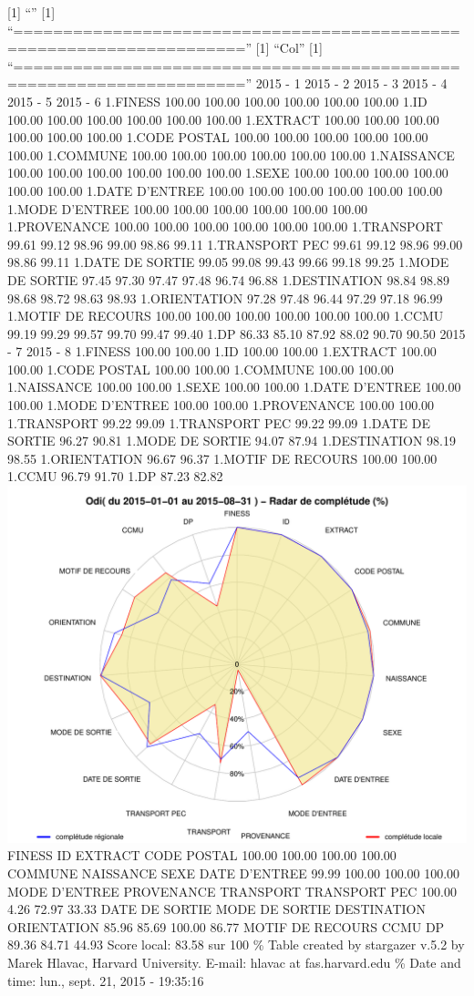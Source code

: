 \documentclass[]{article}
\begin{document}
{[}1{]} ``'' {[}1{]}
``=====================================================================''
{[}1{]} ``Col'' {[}1{]}
``=====================================================================''
2015 - 1 2015 - 2 2015 - 3 2015 - 4 2015 - 5 2015 - 6 1.FINESS 100.00
100.00 100.00 100.00 100.00 100.00 1.ID 100.00 100.00 100.00 100.00
100.00 100.00 1.EXTRACT 100.00 100.00 100.00 100.00 100.00 100.00 1.CODE
POSTAL 100.00 100.00 100.00 100.00 100.00 100.00 1.COMMUNE 100.00 100.00
100.00 100.00 100.00 100.00 1.NAISSANCE 100.00 100.00 100.00 100.00
100.00 100.00 1.SEXE 100.00 100.00 100.00 100.00 100.00 100.00 1.DATE
D'ENTREE 100.00 100.00 100.00 100.00 100.00 100.00 1.MODE D'ENTREE
100.00 100.00 100.00 100.00 100.00 100.00 1.PROVENANCE 100.00 100.00
100.00 100.00 100.00 100.00 1.TRANSPORT 99.61 99.12 98.96 99.00 98.86
99.11 1.TRANSPORT PEC 99.61 99.12 98.96 99.00 98.86 99.11 1.DATE DE
SORTIE 99.05 99.08 99.43 99.66 99.18 99.25 1.MODE DE SORTIE 97.45 97.30
97.47 97.48 96.74 96.88 1.DESTINATION 98.84 98.89 98.68 98.72 98.63
98.93 1.ORIENTATION 97.28 97.48 96.44 97.29 97.18 96.99 1.MOTIF DE
RECOURS 100.00 100.00 100.00 100.00 100.00 100.00 1.CCMU 99.19 99.29
99.57 99.70 99.47 99.40 1.DP 86.33 85.10 87.92 88.02 90.70 90.50 2015 -
7 2015 - 8 1.FINESS 100.00 100.00 1.ID 100.00 100.00 1.EXTRACT 100.00
100.00 1.CODE POSTAL 100.00 100.00 1.COMMUNE 100.00 100.00 1.NAISSANCE
100.00 100.00 1.SEXE 100.00 100.00 1.DATE D'ENTREE 100.00 100.00 1.MODE
D'ENTREE 100.00 100.00 1.PROVENANCE 100.00 100.00 1.TRANSPORT 99.22
99.09 1.TRANSPORT PEC 99.22 99.09 1.DATE DE SORTIE 96.27 90.81 1.MODE DE
SORTIE 94.07 87.94 1.DESTINATION 98.19 98.55 1.ORIENTATION 96.67 96.37
1.MOTIF DE RECOURS 100.00 100.00 1.CCMU 96.79 91.70 1.DP 87.23 82.82
\includegraphics{completude_files/figure-latex/finess-14.pdf} FINESS ID
EXTRACT CODE POSTAL 100.00 100.00 100.00 100.00 COMMUNE NAISSANCE SEXE
DATE D'ENTREE 99.99 100.00 100.00 100.00 MODE D'ENTREE PROVENANCE
TRANSPORT TRANSPORT PEC 100.00 4.26 72.97 33.33 DATE DE SORTIE MODE DE
SORTIE DESTINATION ORIENTATION 85.96 85.69 100.00 86.77 MOTIF DE RECOURS
CCMU DP 89.36 84.71 44.93 Score local: 83.58 sur 100 \% Table created by
stargazer v.5.2 by Marek Hlavac, Harvard University. E-mail: hlavac at
fas.harvard.edu \% Date and time: lun., sept. 21, 2015 - 19:35:16
\end{document}
